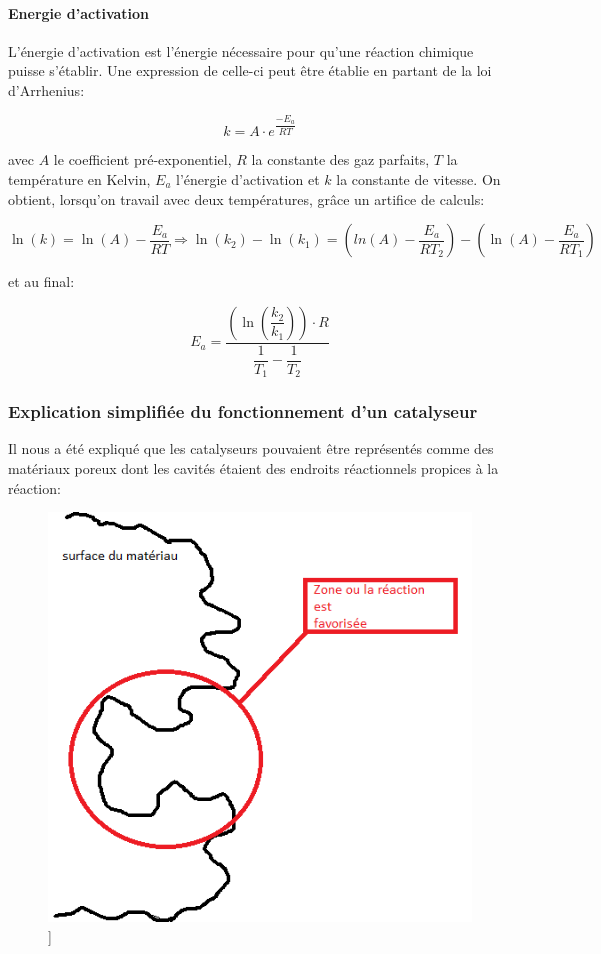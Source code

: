 \paragraph{Energie d'activation}
L'énergie d'activation est l'énergie nécessaire pour qu'une réaction chimique puisse s'établir. Une expression de celle-ci peut être établie en partant de la loi d'Arrhenius:

$$k=A\cdot e^{\dfrac{-E_a}{RT}}$$

avec $A$ le coefficient pré-exponentiel, $R$ la constante des gaz parfaits, $T$ la température en Kelvin, $E_a$ l'énergie d'activation et $k$ la constante de vitesse.
On obtient, lorsqu'on travail avec deux températures, grâce un artifice de calculs:

$$\ln(k) = \ln(A) - \dfrac{E_a}{RT}   \Rightarrow   \ln(k_2) - \ln(k_1) = \left( ln(A) - \dfrac{E_a}{RT_2} \right) - \left( \ln(A) - \dfrac{E_a}{RT_1} \right)$$

et au final:

$$E_a = \dfrac{\left( \ln \left( \dfrac{k_2}{k_1}\right) \right) \cdot R}{\dfrac{1}{T_1} - \dfrac{1}{T_2}}$$

\subsubsection{Explication simplifiée du fonctionnement d'un catalyseur}
Il nous a été expliqué que les catalyseurs pouvaient être représentés comme des matériaux poreux dont les cavités étaient des endroits réactionnels propices à la réaction:

\begin{figure} [h]
\begin{center}
\includegraphics[scale=0.5]{cata}]
\end{center}
\end{figure}

